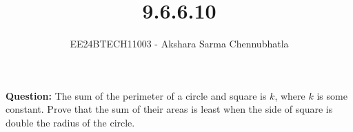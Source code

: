 \documentclass[journal]{IEEEtran}
\begin{document}

\vspace{3cm}

\title{9.6.6.10}
\author{EE24BTECH11003 - Akshara Sarma Chennubhatla}
{\let\newpage\relax\maketitle}
\textbf{Question:}
The sum of the perimeter of a circle and square is $k$, where $k$ is some constant. Prove that the sum of their areas is least when the side of square is double the radius of the circle.

\solution\\
\end{document}
